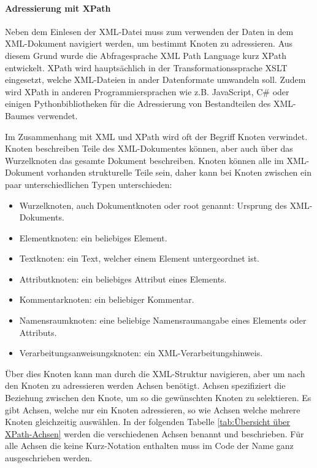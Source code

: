 \paragraph{Adressierung mit XPath}

Neben dem Einlesen der \ac{XML}-Datei muss zum verwenden der Daten in dem \ac{XML}-Dokument navigiert werden, um bestimmt Knoten zu adressieren.
Aus diesem Grund wurde die Abfragesprache XML Path Language kurz XPath entwickelt.
XPath wird hauptsächlich in der Transformationssprache \ac{XSLT} eingesetzt, welche \ac{XML}-Dateien in ander Datenformate umwandeln soll.
Zudem wird XPath in anderen Programmiersprachen wie z.B. JavaScript, C# oder einigen Pythonbibliotheken für die Adressierung von Bestandteilen des \ac{XML}-Baumes verwendet.

Im Zusammenhang mit \ac{XML} und XPath wird oft der Begriff Knoten verwindet.
Knoten beschreiben Teile des \ac{XML}-Dokumentes können, aber auch über das Wurzelknoten das gesamte Dokument beschreiben.
Knoten können alle im \ac{XML}-Dokument vorhanden strukturelle Teile sein,
daher kann bei Knoten zwischen ein paar unterschiedlichen Typen unterschieden:

\begin{itemize}
\item Wurzelknoten, auch Dokumentknoten oder root genannt: Ursprung des \ac{XML}-Dokuments.
\item Elementknoten: ein beliebiges Element.
\item Textknoten: ein Text, welcher einem Element untergeordnet ist.
\item Attributknoten: ein beliebiges Attribut eines Elements.
\item Kommentarknoten: ein beliebiger Kommentar.
\item Namensraumknoten: eine beliebige Namensraumangabe eines Elements oder Attributs.
\item Verarbeitungsanweisungsknoten: ein XML-Verarbeitungshinweis.
\end{itemize}

Über dies Knoten kann man durch die \ac{XML}-Struktur navigieren, aber um nach den Knoten zu adressieren werden Achsen benötigt.
Achsen spezifiziert die Beziehung zwischen den Knote, um so die gewünschten Knoten zu selektieren.
Es gibt Achsen, welche nur ein Knoten adressieren, so wie Achsen welche mehrere Knoten gleichzeitig auswählen.
In der folgenden Tabelle \ref{tab:Übersicht über XPath-Achsen} werden die verschiedenen Achsen benannt und beschrieben.
Für alle Achsen die keine Kurz-Notation enthalten muss im Code der Name ganz ausgeschrieben werden. \cite*{XPath2025}


